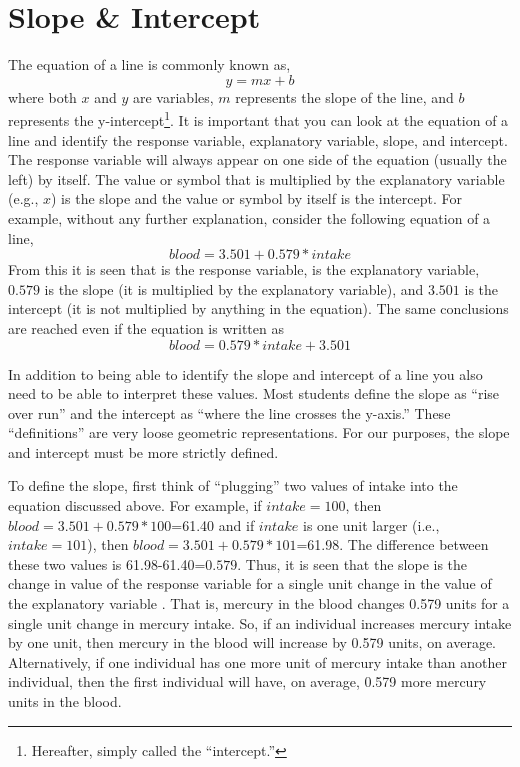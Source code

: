 \documentclass[10pt,openany]{book}\usepackage[]{graphicx}\usepackage[]{color}
\begin{document}
\section{Slope \& Intercept}
The equation of a line is commonly known as,
  \[ y = mx + b  \]
where both $x$ and $y$ are variables, $m$ represents the slope of the line, and $b$ represents the y-intercept\footnote{Hereafter, simply called the ``intercept.''}.  It is important that you can look at the equation of a line and identify the response variable, explanatory variable, slope, and intercept.  The response variable will always appear on one side of the equation (usually the left) by itself.   The value or symbol that is multiplied by the explanatory variable (e.g., $x$) is the slope and the value or symbol by itself is the intercept.  For example, without any further explanation, consider the following equation of a line,
\[ blood = 3.501 + 0.579*intake \]
From this it is seen that  is the response variable,  is the explanatory variable, $0.579$ is the slope (it is multiplied by the explanatory variable), and $3.501$ is the intercept (it is not multiplied by anything in the equation).  The same conclusions are reached even if the equation is written as
  \[ blood = 0.579*intake+3.501 \]


In addition to being able to identify the slope and intercept of a line you also need to be able to interpret these values.  Most students define the slope as ``rise over run'' and the intercept as ``where the line crosses the y-axis.''  These ``definitions'' are very loose geometric representations.  For our purposes, the slope and intercept must be more strictly defined.

To define the slope, first think of ``plugging'' two values of intake into the equation discussed above.  For example, if $intake=100$, then $blood=3.501+0.579*100$=61.40 and if $intake$ is one unit larger (i.e., $intake=101$), then $blood=3.501+0.579*101$=61.98.  The difference between these two values is 61.98-61.40=$0.579$.  Thus, it is seen that the slope is the change in value of the response variable for a single unit change in the value of the explanatory variable .  That is, mercury in the blood changes 0.579 units for a single unit change in mercury intake.  So, if an individual increases mercury intake by one unit, then mercury in the blood will increase by 0.579 units, on average.  Alternatively, if one individual has one more unit of mercury intake than another individual, then the first individual will have, on average, 0.579 more mercury units in the blood.
\end{document}
